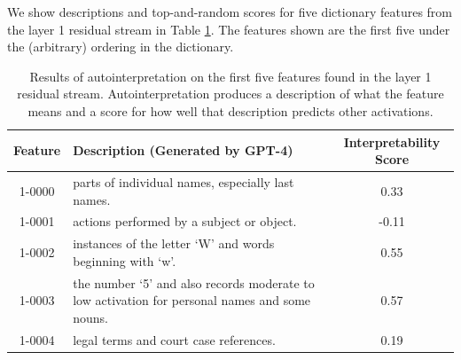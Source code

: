 
We show descriptions and top-and-random scores for five dictionary features from the layer 1 residual stream in Table \ref{table:autointerpretation}. The features shown are the first five under the (arbitrary) ordering in the dictionary.

\begin{table}
    \centering
\begin{tabular}{|c|p{8cm}|c|}  
 \hline
 Feature & Description (Generated by GPT-4) & Interpretability Score \\ 
 \hline
 1-0000 & parts of individual names, especially last names. & 0.33 \\ 
 \hline
 1-0001 & actions performed by a subject or object. & -0.11 \\
 \hline
 1-0002 & instances of the letter `W' and words beginning with `w'. & 0.55 \\ 
 \hline
 1-0003 & the number `5' and also records moderate to low activation for personal names and some nouns. & 0.57 \\
 \hline
 1-0004 & legal terms and court case references. & 0.19 \\
 \hline
\end{tabular}
    \caption{Results of autointerpretation on the first five features found in the layer 1 residual stream. Autointerpretation produces a description of what the feature means and a score for how well that description predicts other activations.}
    \label{table:autointerpretation}
\end{table}

